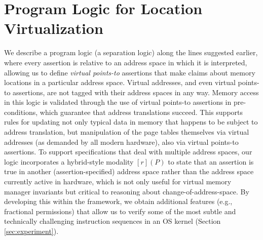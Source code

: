 \section{Program Logic for Location Virtualization}
\label{sec:logic}
\newcommand{\gammaPred}{\delta}
\newcommand{\gammaPreds}{\delta\textsf{s}}
\newcommand{\rtv}{\textsf{rtv}}
\newcommand{\qone}{\texttt{q1}}
\newcommand{\qtwo}{\texttt{q2}}
\newcommand{\qthree}{\texttt{q3}}
\newcommand{\qfour}{\texttt{q4}}

\newcommand{\sumwalkabs}[3]{
  \ownGhost\gammaPred{\authfrag{\singletonMap{#1}{(#2, #3)}}}
}

\newcommand{\sumapaces}[2]{
  \ownGhost\gammaPreds{\authfrag{\singletonMap{#1}{#2}}}
}
\newcommand{\ptableabswalk}[1]{\mathcal{A}\textsf{bsPTableWalk}(#1)}
\newcommand{\ptablestore}{\theta}

We describe a program logic (a separation logic) along the lines suggested earlier, where every assertion is relative
to an address space in which it is interpreted, allowing us to define \emph{virtual points-to} assertions that make claims
about memory locations in a particular address space. Virtual addresses, and even virtual points-to assertions, 
are not tagged with their address spaces in any way. Memory access in this logic is validated through the use 
of virtual points-to assertions in pre-conditions, which guarantee that address translations succeed.
This supports rules for updating not only typical data in memory that happens to be subject to address translation, but
manipulation of the page tables themselves via virtual addresses (as demanded by all modern hardware), also
via virtual points-to assertions.
To support specifications that deal with multiple address spaces, our logic incorporates a hybrid-style modality
$[r](P)$ to state that an assertion is true in another (assertion-specified) address space rather than the address space
currently active in hardware, which is not only useful for virtual memory manager invariants but critical to reasoning
about change-of-address-space.
By developing this within the \iris framework, we obtain additional features (e.g., fractional permissions) that allow us to verify
some of the most subtle and technically challenging instruction sequences in an OS kernel (Section \ref{sec:experiment}).


